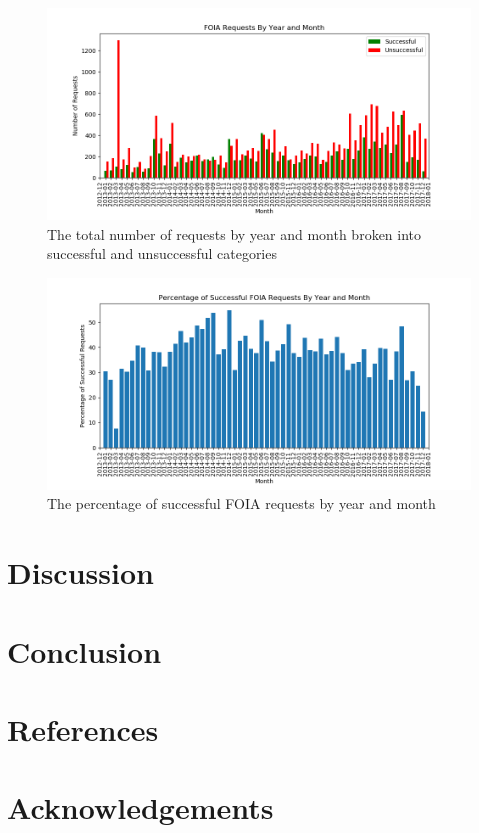 \documentclass{article}
\begin{document}
\begin{figure}[H]
	\centering
	\includegraphics[width=1\textwidth]{monthly_breakdown}
	\caption{The total number of requests by year and month broken into successful and unsuccessful categories}
	\label{fig:monthly_breakdown}
\end{figure}

\begin{figure}[H]
	\centering
	\includegraphics[width=1\textwidth]{monthly_percent_successful}
	\caption{The percentage of successful FOIA requests by year and month}
	\label{fig:monthly_percent_successful}
\end{figure}

\section{Discussion}


\section{Conclusion}


\section{References}


\section{Acknowledgements}
\end{document}
